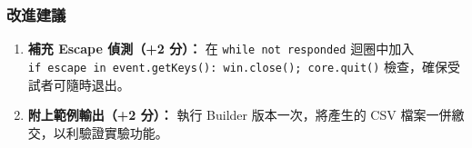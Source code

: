 \documentclass[14pt,]{extarticle}
\providecommand{\tightlist}{%
  \setlength{\itemsep}{0pt}\setlength{\parskip}{0pt}}
\begin{document}
\hypertarget{ux6539ux9032ux5efaux8b70}{%
\subsubsection{改進建議}\label{ux6539ux9032ux5efaux8b70}}

\begin{enumerate}
\def\labelenumi{\arabic{enumi}.}
\tightlist
\item
  \textbf{補充 Escape 偵測（+2 分）：} 在 \texttt{while\ not\ responded}
  迴圈中加入
  \texttt{if\ \textquotesingle{}escape\textquotesingle{}\ in\ event.getKeys():\ win.close();\ core.quit()}
  檢查，確保受試者可隨時退出。
\item
  \textbf{附上範例輸出（+2 分）：} 執行 Builder 版本一次，將產生的 CSV
  檔案一併繳交，以利驗證實驗功能。
\end{enumerate}
\end{document}
